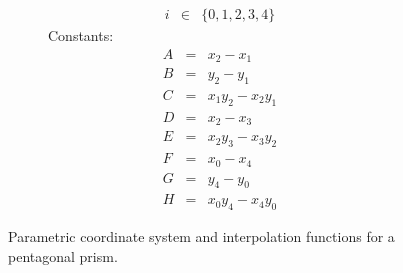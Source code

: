 \begin{description}[leftmargin=0cm,labelindent=0cm]
\begin{figure}[!htb]
\begin{subfigure}{0.48\linewidth}
\begin{equation*}
\begin{array}{lll}
            i &\in& \lbrace 0, 1, 2, 3, 4 \rbrace
            \end{array}
            \end{equation*}
            Constants:
            \begin{equation*}
            \begin{array}{lll}
            A &=& x_2 - x_1 \\
            B &=& y_2 - y_1 \\
            C &=& x_1 y_2 - x_2 y_1 \\
            D &=& x_2 - x_3 \\
            E &=& x_2 y_3 - x_3 y_2 \\
            F &=& x_0 - x_4 \\
            G &=& y_4 - y_0 \\
            H &=& x_0 y_4 - x_4 y_0
            \end{array}
            \end{equation*}
        \end{subfigure}%
        \caption{Parametric coordinate system and interpolation functions for a pentagonal prism.}
        \label{fig:Figure8-14}
    \end{figure}


\end{description}
